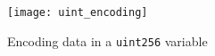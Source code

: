 \begin{figure}[H]
    \centering
    \texttt{[image: uint\_encoding]}
    \caption{Encoding data in a \texttt{uint256} variable}
    \label{fig:uint_encoding}
\end{figure}